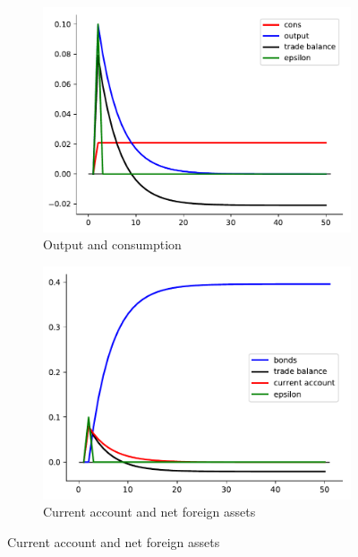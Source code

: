 \documentclass[11pt,pdftex,twoside,letterpaper]{exam}
\begin{document}
\begin{figure}
  \centering
  \caption{Impulse response in the stochastic endowment model ($r=0.05$ and $\rho=0.8$).}\label{fig:stochastic-endowment}
  \begin{subfigure}{0.49\textwidth}
    \includegraphics[width=\textwidth]{figures/cy_st.pdf}
    \caption{Output and consumption}
  \end{subfigure}
  \begin{subfigure}{0.49\textwidth}
    \includegraphics[width=\textwidth]{figures/debt_st.pdf}
    \caption{Current account and net foreign assets}
  \end{subfigure}
\end{figure}
\end{document}
